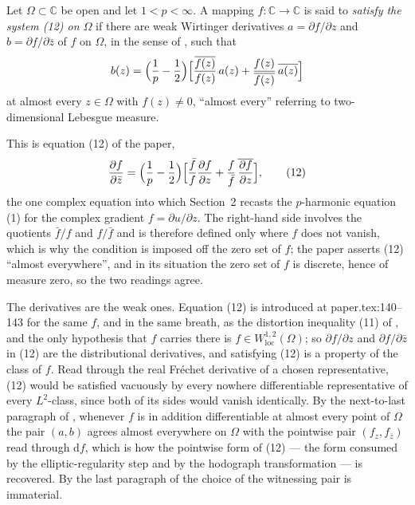 \begin{definition}
Let $\Omega\subset\mathbb{C}$ be open and let $1<p<\infty$.  A mapping
$f\colon\mathbb{C}\to\mathbb{C}$ is said to \emph{satisfy the system (12) on
$\Omega$} if there are weak Wirtinger derivatives $a=\partial f/\partial z$
and $b=\partial f/\partial\bar z$ of $f$ on $\Omega$, in the sense of
, such that
\[
  b(z)
  =\Bigl(\frac1p-\frac12\Bigr)
   \Bigl[\frac{\overline{f(z)}}{f(z)}\,a(z)
     +\frac{f(z)}{\overline{f(z)}}\,\overline{a(z)}\Bigr]
\]
at almost every $z\in\Omega$ with $f(z)\neq0$, ``almost every'' referring to
two-dimensional Lebesgue measure.

This is equation (12) of the paper,
\[
  \frac{\partial f}{\partial\bar z}
  =\Bigl(\frac1p-\frac12\Bigr)
   \Bigl[\frac{\bar f}{f}\frac{\partial f}{\partial z}
        +\frac f{\bar f}\,\overline{\frac{\partial f}{\partial z}}\Bigr],
  \tag{12}
\]
the one complex equation into which Section~2 recasts the $p$-harmonic
equation (1) for the complex gradient $f=\partial u/\partial z$.  The
right-hand side involves the quotients $\bar f/f$ and $f/\bar f$ and is
therefore defined only where $f$ does not vanish, which is why the condition
is imposed off the zero set of $f$; the paper asserts (12) ``almost
everywhere'', and in its situation the zero set of $f$ is discrete, hence of
measure zero, so the two readings agree.

The derivatives are the weak ones.  Equation (12) is introduced at
paper.tex:140--143 for the same $f$, and in the same breath, as the distortion
inequality (11) of , and the only hypothesis that $f$
carries there is $f\in W^{1,2}_{\mathrm{loc}}(\Omega)$; so $\partial f/\partial z$
and $\partial f/\partial\bar z$ in (12) are the distributional derivatives,
and satisfying (12) is a property of the class of $f$.  Read through the real
Fr\'echet derivative of a chosen representative, (12) would be satisfied
vacuously by every nowhere differentiable representative of every $L^2$-class,
since both of its sides would vanish identically.  By the next-to-last
paragraph of , whenever $f$ is in addition
differentiable at almost every point of $\Omega$ the pair $(a,b)$ agrees
almost everywhere on $\Omega$ with the pointwise pair $(f_z,f_{\bar z})$ read
through $\mathrm{d}f$, which is how the pointwise form of (12) --- the form
consumed by the elliptic-regularity step and by the hodograph transformation
--- is recovered.  By the last paragraph of  the
choice of the witnessing pair is immaterial.
\end{definition}

